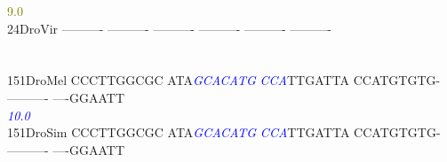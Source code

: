 \documentclass[11pt,twoside,reqno,a4paper]{article}
\begin{document}
{\hspace*{4\charwidth}\hspace*{7\charwidth}\hspace*{0\charwidth}\textcolor{olive}{9.0}\hspace*{1\charwidth}\hspace*{1\charwidth}\hspace*{1\charwidth}\hspace*{1\charwidth}\hspace*{1\charwidth}\hspace*{1\charwidth}\\
24\hspace*{2\charwidth}DroVir	----------	----------	----------	----------	----------	----------	\\
\hspace*{4\charwidth}\hspace*{7\charwidth}\hspace*{1\charwidth}\hspace*{1\charwidth}\hspace*{1\charwidth}\hspace*{1\charwidth}\hspace*{1\charwidth}\hspace*{1\charwidth}\\
\\
151\hspace*{1\charwidth}DroMel	CCCTTGGCGC	ATA\textit{\textcolor{blue}{G}}\textit{\textcolor{blue}{C}}\textit{\textcolor{blue}{A}}\textit{\textcolor{blue}{C}}\textit{\textcolor{blue}{A}}\textit{\textcolor{blue}{T}}\textit{\textcolor{blue}{G}}	\textit{\textcolor{blue}{C}}\textit{\textcolor{blue}{C}}\textit{\textcolor{blue}{A}}TTGATTA	CCATGTGTG-	----------	----GGAATT	\\
\hspace*{4\charwidth}\hspace*{7\charwidth}\hspace*{1\charwidth}\hspace*{13\charwidth}\textit{\textcolor{blue}{10.0}}\hspace*{1\charwidth}\hspace*{1\charwidth}\hspace*{1\charwidth}\hspace*{1\charwidth}\hspace*{1\charwidth}\\
151\hspace*{1\charwidth}DroSim	CCCTTGGCGC	ATA\textit{\textcolor{blue}{G}}\textit{\textcolor{blue}{C}}\textit{\textcolor{blue}{A}}\textit{\textcolor{blue}{C}}\textit{\textcolor{blue}{A}}\textit{\textcolor{blue}{T}}\textit{\textcolor{blue}{G}}	\textit{\textcolor{blue}{C}}\textit{\textcolor{blue}{C}}\textit{\textcolor{blue}{A}}TTGATTA	CCATGTGTG-	----------	----GGAATT	\\
}
\end{document}
